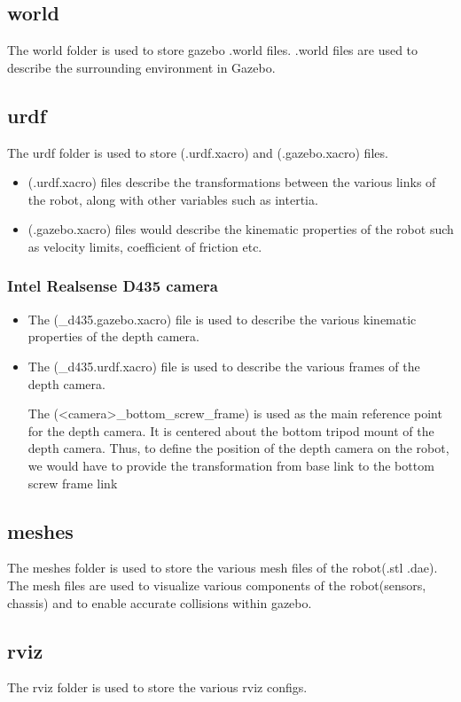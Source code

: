 \documentclass[11pt]{article}
\begin{document}
\subsection{world}
The world folder is used to store gazebo .world files. .world files are used to describe the surrounding environment in Gazebo.
\subsection{urdf}
The urdf folder is used to store (.urdf.xacro) and (.gazebo.xacro) files.
\begin{itemize}
 \item {
       (.urdf.xacro) files describe the transformations between the various links of the robot, along with other variables such as intertia.
       }
 \item{
       (.gazebo.xacro) files would describe the kinematic properties of the robot such as velocity limits, coefficient of friction etc.
       }
\end{itemize}
\subsubsection{Intel Realsense D435 camera}
\begin{itemize}
 \item {
       The (\_d435.gazebo.xacro) file is used to describe the various kinematic properties of the depth camera.
       }
 \item{
       The (\_d435.urdf.xacro) file is used to describe the various frames of the depth camera.
       
       The (<camera>\_bottom\_screw\_frame) is used as the main reference point for the depth camera. It is centered about the bottom tripod mount of the depth camera.
       Thus, to define the position of the depth camera on the robot, we would have to provide the transformation from base link to the bottom screw frame link
       }
\end{itemize}

\subsection{meshes}
The meshes folder is used to store the various mesh files of the robot(.stl .dae).
The mesh files are used to visualize various components of the robot(sensors, chassis) and to enable accurate collisions within gazebo.

\subsection{rviz}
The rviz folder is used to store the various rviz configs.
\end{document}
